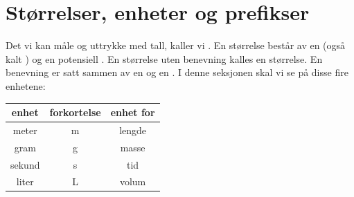 





\section{Størrelser, enheter og prefikser}
Det vi kan måle og uttrykke med tall, kaller vi . En størrelse består av en  (også kalt ) og en potensiell . En størrelse uten benevning kalles en  størrelse. En benevning er satt sammen av en  og en . I denne seksjonen skal vi se på disse fire enhetene:
\tbs
\begin{center}
	\begin{tabular}{c|c|c}
		\textbf{enhet} & \textbf{forkortelse} &\textbf{enhet for}\\ \hline
		meter & m &lengde\\\hline
		gram & g &masse\\\hline
		sekund & s & tid\\\hline 
		liter & L & volum
	\end{tabular}
\end{center}\tbs

